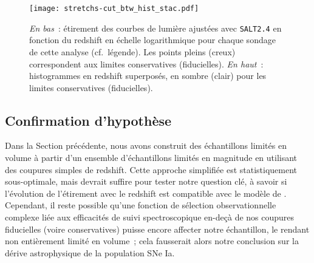 \documentclass[../main/main.tex]{subfiles}
\begin{document}
\begin{figure}
    \centering
    \texttt{[image: stretchs-cut\_btw\_hist\_stac.pdf]}
    \caption[Présentation des données d'étirement en fonction du
    redshift.]{\textit{En bas}~: étirement des courbes de lumière ajustées avec
        \textsc{\texttt{SALT2.4}} en fonction du redshift en échelle
        logarithmique pour chaque sondage de cette analyse (cf.~légende). Les
        points pleins (creux) correspondent aux limites conservatives
        (fiducielles). \textit{En haut}~: histogrammes en redshift superposés,
        en sombre (clair) pour les limites conservatives
    (fiducielles).}\label{fig:sample}
\end{figure}

\subsection{Confirmation d'hypothèse}\label{ssec:testvl}

% 

Dans la Section précédente, nous avons construit des échantillons limités en
volume à partir d'un ensemble d'échantillons limités en magnitude en utilisant
des coupures simples de redshift. Cette approche simplifiée est
statistiquement sous-optimale, mais devrait suffire pour tester notre question
clé, à savoir si l'évolution de l'étirement avec le redshift est compatible avec le
modèle de \cite{rigault2020}. Cependant, il reste possible qu'une fonction de
sélection observationnelle complexe liée aux efficacités de suivi
spectroscopique en-deçà de nos coupures fiducielles (voire conservatives) puisse
encore affecter notre échantillon, le rendant non entièrement limité en volume~;
cela fausserait alors notre conclusion sur la dérive astrophysique de la
population SNe Ia.
\end{document}
